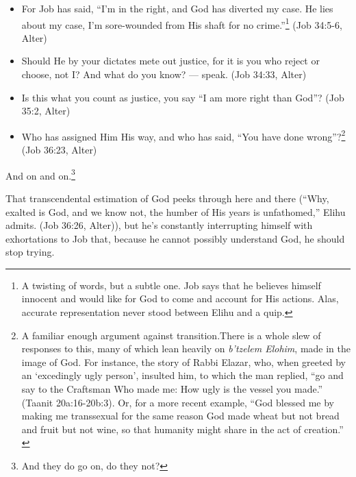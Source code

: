 \begin{itemize}
\item For Job has said, ``I'm in the right, and God has diverted my case. He lies about my case, I'm sore-wounded from His shaft for no crime.''\footnote{A twisting of words, but a subtle one. Job says that he believes himself innocent and would like for God to come and account for His actions. Alas, accurate representation never stood between Elihu and a quip.} (Job 34:5-6, Alter)
\item Should He by your dictates mete out justice, for it is you who reject or choose, not I? And what do you know? --- speak. (Job 34:33, Alter)
\item Is this what you count as justice, you say ``I am more right than God''? (Job 35:2, Alter)
\item Who has assigned Him His way, and who has said, ``You have done wrong''?\footnote{A familiar enough argument against transition.\footnotemark There is a whole slew of responses to this, many of which lean heavily on \emph{b'tzelem Elohim}, made in the image of God. For instance, the story of Rabbi Elazar, who, when greeted by an `excedingly ugly person', insulted him, to which the man replied, ``go and say to the Craftsman Who made me: How ugly is the vessel you made.'' (Taanit 20a:16-20b:3)\nocite{sefaria}. Or, for a more recent example, ``God blessed me by making me transsexual for the same reason God made wheat but not bread and fruit but not wine, so that humanity might share in the act of creation.'' \parencite{ortberg}} (Job 36:23, Alter)
\end{itemize}

And on and on.\footnote{And they do go on, do they not?}

That transcendental estimation of God peeks through here and there (``Why, exalted is God, and we know not, the humber of His years is unfathomed,'' Elihu admits. (Job 36:26, Alter)), but he's constantly interrupting himself with exhortations to Job that, because he cannot possibly understand God, he should stop trying.

